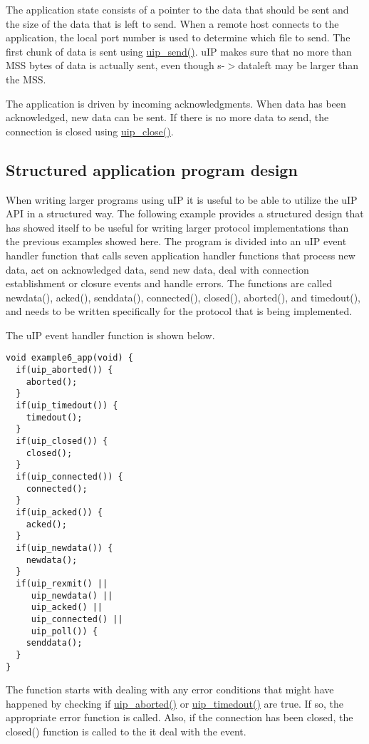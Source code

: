 The application state consists of a pointer to the data that should be sent and the size of the data that is left to send. When a remote host connects to the application, the local port number is used to determine which file to send. The first chunk of data is sent using \hyperlink{a00064_gb59415b2801e568f52bc1d86ef10e159}{uip\_\-send()}. u\-IP makes sure that no more than MSS bytes of data is actually sent, even though s-$>$dataleft may be larger than the MSS.

The application is driven by incoming acknowledgments. When data has been acknowledged, new data can be sent. If there is no more data to send, the connection is closed using \hyperlink{a00064_g61db1dcb7c760e4dd5d60bf4e5576dca}{uip\_\-close()}.\hypertarget{main_example6}{}\subsection{Structured application program design}\label{main_example6}
When writing larger programs using u\-IP it is useful to be able to utilize the u\-IP API in a structured way. The following example provides a structured design that has showed itself to be useful for writing larger protocol implementations than the previous examples showed here. The program is divided into an u\-IP event handler function that calls seven application handler functions that process new data, act on acknowledged data, send new data, deal with connection establishment or closure events and handle errors. The functions are called newdata(), acked(), senddata(), connected(), closed(), aborted(), and timedout(), and needs to be written specifically for the protocol that is being implemented.

The u\-IP event handler function is shown below.



\footnotesize\begin{verbatim}void example6_app(void) {
  if(uip_aborted()) {
    aborted();
  }
  if(uip_timedout()) {
    timedout();
  }
  if(uip_closed()) {
    closed();
  }
  if(uip_connected()) {
    connected();
  }
  if(uip_acked()) {
    acked();
  }
  if(uip_newdata()) {
    newdata();
  }
  if(uip_rexmit() ||
     uip_newdata() ||
     uip_acked() ||
     uip_connected() ||
     uip_poll()) {
    senddata();
  }
}
\end{verbatim}
\normalsize


The function starts with dealing with any error conditions that might have happened by checking if \hyperlink{a00064_gfbd5fc486dfdf6bf6fc9db52b1f418c4}{uip\_\-aborted()} or \hyperlink{a00064_g7b2ac4b18bd2ac3912fe67b3b17158c3}{uip\_\-timedout()} are true. If so, the appropriate error function is called. Also, if the connection has been closed, the closed() function is called to the it deal with the event.


